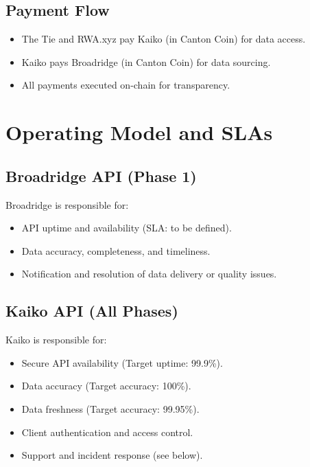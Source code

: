 \documentclass[12pt,a4paper]{article}
\begin{document}
\subsection*{Payment Flow}
\begin{itemize}[leftmargin=*]
    \item The Tie and RWA.xyz pay Kaiko (in Canton Coin) for data access.
    \item Kaiko pays Broadridge (in Canton Coin) for data sourcing.
    \item All payments executed on-chain for transparency.
\end{itemize}

\section{Operating Model and SLAs}

\subsection*{Broadridge API (Phase 1)}
Broadridge is responsible for:
\begin{itemize}[leftmargin=*]
    \item API uptime and availability (SLA: to be defined).
    \item Data accuracy, completeness, and timeliness.
    \item Notification and resolution of data delivery or quality issues.
\end{itemize}

\subsection*{Kaiko API (All Phases)}
Kaiko is responsible for:
\begin{itemize}[leftmargin=*]
    \item Secure API availability (Target uptime: 99.9\%).
    \item Data accuracy (Target accuracy: 100\%).
    \item Data freshness (Target accuracy: 99.95\%).
    \item Client authentication and access control.
    \item Support and incident response (see below).
\end{itemize}
\end{document}
